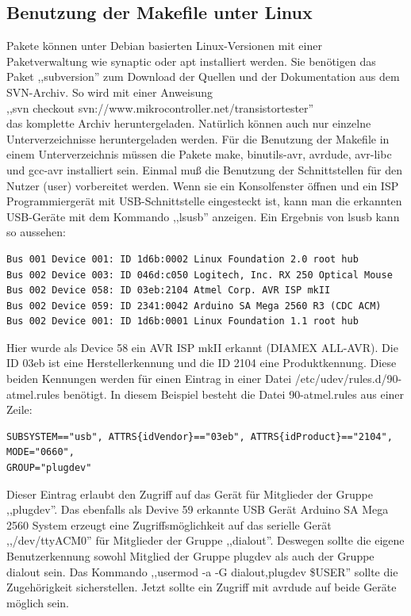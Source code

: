 \subsection{Benutzung der Makefile unter Linux}
Pakete können unter Debian basierten Linux-Versionen mit einer Paketverwaltung wie synaptic oder apt installiert werden.
Sie benötigen das Paket ,,subversion'' zum Download der Quellen und der
Dokumentation aus dem SVN-Archiv.
So wird mit einer Anweisung \\
,,svn checkout svn://www.mikrocontroller.net/transistortester'' \\
das komplette Archiv heruntergeladen. Natürlich können auch nur einzelne Unterverzeichnisse
heruntergeladen werden.
Für die Benutzung der Makefile in einem Unterverzeichnis müssen die Pakete
make, binutils-avr, avrdude, avr-libc und gcc-avr installiert sein.
Einmal muß die Benutzung der Schnittstellen für den Nutzer (user) vorbereitet werden.
Wenn sie ein Konsolfenster öffnen und ein ISP Programmiergerät mit USB-Schnittstelle eingesteckt ist,
kann man die erkannten USB-Geräte mit dem Kommando ,,lsusb'' anzeigen.
Ein Ergebnis von lsusb kann so aussehen:
\begin{verbatim}
Bus 001 Device 001: ID 1d6b:0002 Linux Foundation 2.0 root hub
Bus 002 Device 003: ID 046d:c050 Logitech, Inc. RX 250 Optical Mouse
Bus 002 Device 058: ID 03eb:2104 Atmel Corp. AVR ISP mkII
Bus 002 Device 059: ID 2341:0042 Arduino SA Mega 2560 R3 (CDC ACM)
Bus 002 Device 001: ID 1d6b:0001 Linux Foundation 1.1 root hub
\end{verbatim}
Hier wurde als Device 58 ein AVR ISP mkII erkannt (DIAMEX ALL-AVR). Die ID 03eb ist eine
Herstellerkennung und die ID 2104 eine Produktkennung. Diese beiden Kennungen werden
für einen Eintrag in einer Datei /etc/udev/rules.d/90-atmel.rules benötigt.
In diesem Beispiel besteht die Datei 90-atmel.rules aus einer Zeile:
\begin{verbatim}
SUBSYSTEM=="usb", ATTRS{idVendor}=="03eb", ATTRS{idProduct}=="2104", MODE="0660",
GROUP="plugdev"
\end{verbatim}
Dieser Eintrag erlaubt den Zugriff auf das Gerät für Mitglieder der Gruppe ,,plugdev''.
Das ebenfalls als Devive 59 erkannte USB Gerät  Arduino SA Mega 2560 System erzeugt eine
Zugriffsmöglichkeit auf das serielle Gerät ,,/dev/ttyACM0'' für Mitglieder der Gruppe ,,dialout''.
Deswegen sollte die eigene Benutzerkennung sowohl Mitglied der Gruppe plugdev als auch
der Gruppe dialout sein.
Das Kommando ,,usermod -a -G dialout,plugdev \$USER'' sollte die Zugehörigkeit sicherstellen.
Jetzt sollte ein Zugriff mit avrdude auf beide Geräte möglich sein.

